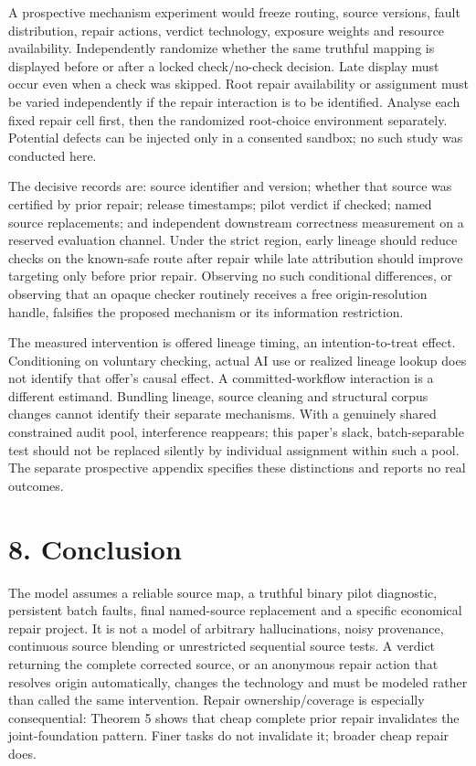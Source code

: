 \documentclass[
  11pt,
  a4paper,
]{article}
\begin{document}
A prospective mechanism experiment would freeze routing, source
versions, fault distribution, repair actions, verdict technology,
exposure weights and resource availability. Independently randomize
whether the same truthful mapping is displayed before or after a locked
check/no-check decision. Late display must occur even when a check was
skipped. Root repair availability or assignment must be varied
independently if the repair interaction is to be identified. Analyse
each fixed repair cell first, then the randomized root-choice
environment separately. Potential defects can be injected only in a
consented sandbox; no such study was conducted here.

The decisive records are: source identifier and version; whether that
source was certified by prior repair; release timestamps; pilot verdict
if checked; named source replacements; and independent downstream
correctness measurement on a reserved evaluation channel. Under the
strict region, early lineage should reduce checks on the known-safe
route after repair while late attribution should improve targeting only
before prior repair. Observing no such conditional differences, or
observing that an opaque checker routinely receives a free
origin-resolution handle, falsifies the proposed mechanism or its
information restriction.

The measured intervention is offered lineage timing, an
intention-to-treat effect. Conditioning on voluntary checking, actual AI
use or realized lineage lookup does not identify that offer's causal
effect. A committed-workflow interaction is a different estimand.
Bundling lineage, source cleaning and structural corpus changes cannot
identify their separate mechanisms. With a genuinely shared constrained
audit pool, interference reappears; this paper's slack, batch-separable
test should not be replaced silently by individual assignment within
such a pool. The separate prospective appendix specifies these
distinctions and reports no real outcomes.

\section{8. Conclusion}\label{limitations-and-conclusion}

The model assumes a reliable source map, a truthful binary pilot
diagnostic, persistent batch faults, final named-source replacement and
a specific economical repair project. It is not a model of arbitrary
hallucinations, noisy provenance, continuous source blending or
unrestricted sequential source tests. A verdict returning the complete
corrected source, or an anonymous repair action that resolves origin
automatically, changes the technology and must be modeled rather than
called the same intervention. Repair ownership/coverage is especially
consequential: Theorem 5 shows that cheap complete prior repair
invalidates the joint-foundation pattern. Finer tasks do not invalidate
it; broader cheap repair does.
\end{document}
